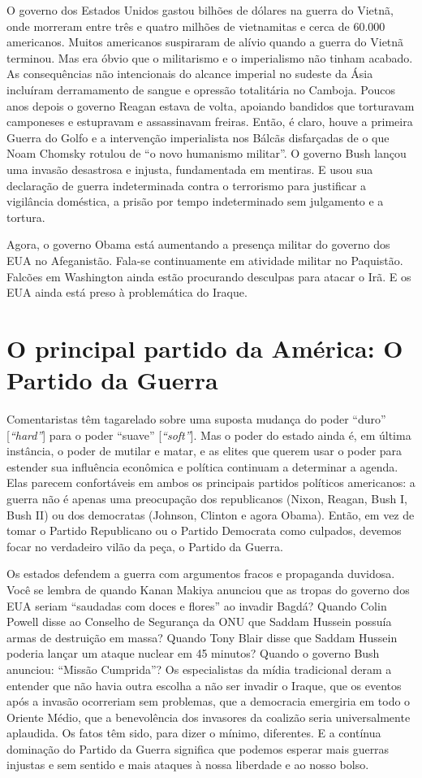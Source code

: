 O governo dos Estados Unidos gastou bilhões de dólares na guerra do Vietnã, onde morreram entre três e quatro milhões de vietnamitas e cerca de 60.000 americanos. Muitos americanos suspiraram de alívio quando a guerra do Vietnã terminou. Mas era óbvio que o militarismo e o imperialismo não tinham acabado. As consequências não intencionais do alcance imperial no sudeste da Ásia incluíram derramamento de sangue e opressão totalitária no Camboja. Poucos anos depois o governo Reagan estava de volta, apoiando bandidos que torturavam camponeses e estupravam e assassinavam freiras. Então, é claro, houve a primeira Guerra do Golfo e a intervenção imperialista nos Bálcãs disfarçadas de o que Noam Chomsky rotulou de ``o novo humanismo militar''. O governo Bush lançou uma invasão desastrosa e injusta, fundamentada em mentiras. E usou sua declaração de guerra indeterminada contra o terrorismo para justificar a vigilância doméstica, a prisão por tempo indeterminado sem julgamento e a tortura.

Agora, o governo Obama está aumentando a presença militar do governo dos EUA no Afeganistão. Fala-se continuamente em atividade militar no Paquistão. Falcões em Washington ainda estão procurando desculpas para atacar o Irã. E os EUA ainda está preso à problemática do Iraque.

\section{O principal partido da América: O Partido da Guerra}

Comentaristas têm tagarelado sobre uma suposta mudança do poder ``duro'' [\emph{``hard''}] para o poder ``suave'' [\emph{``soft''}]. Mas o poder do estado ainda é, em última instância, o poder de mutilar e matar, e as elites que querem usar o poder para estender sua influência econômica e política continuam a determinar a agenda. Elas parecem confortáveis em ambos os principais partidos políticos americanos: a guerra não é apenas uma preocupação dos republicanos (Nixon, Reagan, Bush I, Bush II) ou dos democratas (Johnson, Clinton e agora Obama). Então, em vez de tomar o Partido Republicano ou o Partido Democrata como culpados, devemos focar no verdadeiro vilão da peça, o Partido da Guerra.

Os estados defendem a guerra com argumentos fracos e propaganda duvidosa. Você se lembra de quando Kanan Makiya anunciou que as tropas do governo dos EUA seriam ``saudadas com doces e flores'' ao invadir Bagdá? Quando Colin Powell disse ao Conselho de Segurança da ONU que Saddam Hussein possuía armas de destruição em massa? Quando Tony Blair disse que Saddam Hussein poderia lançar um ataque nuclear em 45 minutos? Quando o governo Bush anunciou: ``Missão Cumprida''? Os especialistas da mídia tradicional deram a entender que não havia outra escolha a não ser invadir o Iraque, que os eventos após a invasão ocorreriam sem problemas, que a democracia emergiria em todo o Oriente Médio, que a benevolência dos invasores da coalizão seria universalmente aplaudida. Os fatos têm sido, para dizer o mínimo, diferentes. E a contínua dominação do Partido da Guerra significa que podemos esperar mais guerras injustas e sem sentido e mais ataques à nossa liberdade e ao nosso bolso.

